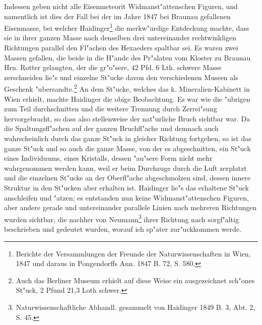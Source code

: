 \documentclass[a4paper, 11pt, oneside]{article}
\begin{document}
Indessen geben nicht alle Eisenmeteorit Widmanst"attenschen Figuren, und namentlich ist dies der Fall bei der im Jahre 1847 bei Braunau gefallenen Eisenmasse, bei welcher Haidinger\footnote{Berichte der Versammlungen der Freunde der Naturwissenschaften in Wien, 1847 und daraus in Pongendorffs Ann. 1847 B. 72, S. 580.} die merkw"urdige Entdeckung machte, dass sie in ihrer ganzen Masse nach denselben drei untereinander rechtwinkligen Richtungen parallel den Fl"achen des Hexaeders spaltbar sei. Es waren zwei Massen gefallen, die beide in die H"ande des Pr"alaten vom Kloster zu Braunau Hrn. Rotter gelangten, der die gr"o"sere, 42 Pfd. 6 Lth. schwere Masse zerschneiden lie"s und einzelne St"ucke davon den verschiedenen Museen als Geschenk "ubersandte.\footnote{Auch das Berliner Museum erhielt auf diese Weise ein ausgezeichnet sch"ones St"uck, 2 Pfund 21,3 Loth schwer.} An dem St"ucke, welches das k. Mineralien-Kabinett in Wien erhielt, machte Haidinger die obige Beobachtung. Es war wie die "ubrigen zum Teil durchschnitten und die weitere Trennung durch Zerrei"sung hervorgebracht, so dass also stellenweise der nat"urliche Bruch sichtbar war. Da die Spaltungsfl"achen auf der ganzen Bruchfl"ache und demnach auch wahrscheinlich durch das ganze St"uck in gleicher Richtung fortgehen, so ist das ganze St"uck und so auch die ganze Masse, von der es abgeschnitten, ein St"uck eines Individuums, eines Kristalls, dessen "au"sere Form nicht mehr wahrgenommen werden kann, weil er beim Durchzuge durch die Luft zerplatzt und die einzelnen St"ucke an der Oberfl"ache abgeschmolzen sind, dessen innere Struktur in den St"ucken aber erhalten ist. Haidinger lie"s das erhaltene St"uck anschleifen und "atzen; es entstanden nun keine Widmanst"attenschen Figuren, aber andere gerade und untereinander parallele Linien nach mehreren Richtungen wurden sichtbar, die nachher von Neumann\footnote{Naturwissenschaftliche Abhandl. gesammelt von Haidinger 1849 B. 3, Abt. 2, S. 45.} ihrer Richtung nach sorgf"altig beschrieben und gedeutet wurden, worauf ich sp"ater zur"uckkommen werde.
\end{document}
